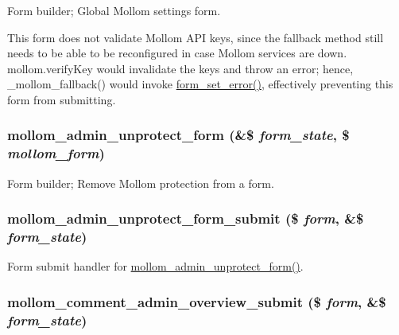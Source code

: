 Form builder; Global Mollom settings form.

This form does not validate Mollom API keys, since the fallback method still needs to be able to be reconfigured in case Mollom services are down. mollom.verifyKey would invalidate the keys and throw an error; hence, \_\-mollom\_\-fallback() would invoke \hyperlink{group__form__api_g08508e9a72925348973bb1a051a3ab99}{form\_\-set\_\-error()}, effectively preventing this form from submitting. \hypertarget{mollom_8admin_8inc_28f6764e8ab7d9d7007daed2051eabde}{
\subsubsection[{mollom\_\-admin\_\-unprotect\_\-form}]{\setlength{\rightskip}{0pt plus 5cm}mollom\_\-admin\_\-unprotect\_\-form (\&\$ {\em form\_\-state}, \/  \$ {\em mollom\_\-form})}}
\label{mollom_8admin_8inc_28f6764e8ab7d9d7007daed2051eabde}


Form builder; Remove Mollom protection from a form. \hypertarget{mollom_8admin_8inc_655b63c140bb3be5132635c9af7fbbc9}{
\subsubsection[{mollom\_\-admin\_\-unprotect\_\-form\_\-submit}]{\setlength{\rightskip}{0pt plus 5cm}mollom\_\-admin\_\-unprotect\_\-form\_\-submit (\$ {\em form}, \/  \&\$ {\em form\_\-state})}}
\label{mollom_8admin_8inc_655b63c140bb3be5132635c9af7fbbc9}


Form submit handler for \hyperlink{mollom_8admin_8inc_28f6764e8ab7d9d7007daed2051eabde}{mollom\_\-admin\_\-unprotect\_\-form()}. \hypertarget{mollom_8admin_8inc_9d2bf25920e01ea84e82fc8d3073e4b0}{
\subsubsection[{mollom\_\-comment\_\-admin\_\-overview\_\-submit}]{\setlength{\rightskip}{0pt plus 5cm}mollom\_\-comment\_\-admin\_\-overview\_\-submit (\$ {\em form}, \/  \&\$ {\em form\_\-state})}}
\label{mollom_8admin_8inc_9d2bf25920e01ea84e82fc8d3073e4b0}


